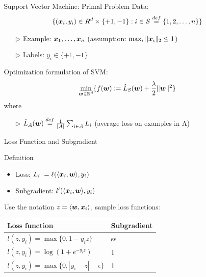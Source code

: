 \begin{frame}{Support Vector Machine: Primal Problem}
    Data: 
    \[
        \{(\bm{x}_i,y_i)\in R^d \times \{+1, -1\}: i\in S \overset{def}{=} \{1,2,\ldots,n\}\}
    \]
    \begin{itemize}
        \item[$\rhd$] Example: $\bm{x}_1,\ldots,\bm{x}_n$ (assumption: $\max_i\|\bm{x}_i\|_2\le 1$)
        \item[$\rhd$] Labels: $y_i \in\{+1,-1\}$
    \end{itemize}
    {\color{red} Optimization formulation of SVM:}
    \[
        \min_{\bm{w}\in\mathbb{R}^d} \{ f(\bm{w}):= \hat{L}_S(\bm{w})+\frac {\lambda} {2} \|\bm{w}\|^2 \}
    \]
    where 
    \begin{itemize}
        \item[$\rhd$] $\hat{L}_A(\bm{w}) \overset{def}{=} \frac{1}{|A|} \sum_{i\in A} L_i$ (average loss on examples in A)
    \end{itemize}
\end{frame}

\begin{frame}{Loss Function and Subgradient}
    \begin{block}{Definition}
        \begin{itemize}
            \item Loss: $L_i := \ell(\langle \bm{x}_i, \bm{w} \rangle, y_i)$

            \item Subgradient: $l'(\langle \bm{x}_i, \bm{w} \rangle, y_i)$
        \end{itemize}
    \end{block}
    Use the notation $z=\langle \bm{w}, \bm{x}_i\rangle$, sample loss functions:
    \begin{table}[h]
        \begin{tabular}{|l|l|}
            \hline
            Loss function & Subgradient  \\ \hline
            $l(z,y_i) = \max\{0,1-y_i z\}$ & ss \\ \hline%
            $l(z,y_i) = \log(1+e^{-y_iz})$ & 1\\ \hline
            $l(z,y_i) = \max\{0, | y_i - z| - \epsilon\}$ & 1 \\ \hline
        \end{tabular}
    \end{table}
\end{frame}


